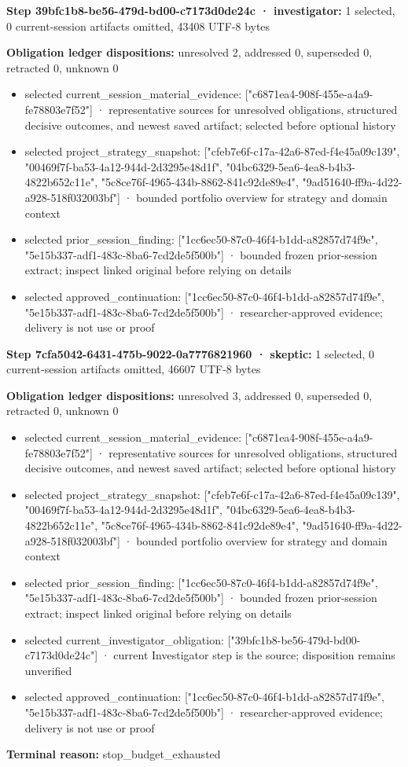 \documentclass[11pt]{article}
\begin{document}
\textbf{Step 39bfc1b8-be56-479d-bd00-c7173d0de24c · investigator:} 1 selected, 0 current-session artifacts omitted, 43408 UTF-8 bytes\par
\textbf{Obligation ledger dispositions:} unresolved 2, addressed 0, superseded 0, retracted 0, unknown 0\par
\begin{itemize}
\item selected current\_session\_material\_evidence: ["c6871ea4-908f-455e-a4a9-fe78803e7f52"] · representative sources for unresolved obligations, structured decisive outcomes, and newest saved artifact; selected before optional history
\item selected project\_strategy\_snapshot: ["cfeb7e6f-c17a-42a6-87ed-f4e45a09c139", "00469f7f-ba53-4a12-944d-2d3295e48d1f", "04bc6329-5ea6-4ea8-b4b3-4822b652c11e", "5c8ce76f-4965-434b-8862-841c92de89e4", "9ad51640-ff9a-4d22-a928-518f032003bf"] · bounded portfolio overview for strategy and domain context
\item selected prior\_session\_finding: ["1cc6ec50-87c0-46f4-b1dd-a82857d74f9e", "5e15b337-adf1-483c-8ba6-7cd2de5f500b"] · bounded frozen prior-session extract; inspect linked original before relying on details
\item selected approved\_continuation: ["1cc6ec50-87c0-46f4-b1dd-a82857d74f9e", "5e15b337-adf1-483c-8ba6-7cd2de5f500b"] · researcher-approved evidence; delivery is not use or proof
\end{itemize}
\textbf{Step 7cfa5042-6431-475b-9022-0a7776821960 · skeptic:} 1 selected, 0 current-session artifacts omitted, 46607 UTF-8 bytes\par
\textbf{Obligation ledger dispositions:} unresolved 3, addressed 0, superseded 0, retracted 0, unknown 0\par
\begin{itemize}
\item selected current\_session\_material\_evidence: ["c6871ea4-908f-455e-a4a9-fe78803e7f52"] · representative sources for unresolved obligations, structured decisive outcomes, and newest saved artifact; selected before optional history
\item selected project\_strategy\_snapshot: ["cfeb7e6f-c17a-42a6-87ed-f4e45a09c139", "00469f7f-ba53-4a12-944d-2d3295e48d1f", "04bc6329-5ea6-4ea8-b4b3-4822b652c11e", "5c8ce76f-4965-434b-8862-841c92de89e4", "9ad51640-ff9a-4d22-a928-518f032003bf"] · bounded portfolio overview for strategy and domain context
\item selected prior\_session\_finding: ["1cc6ec50-87c0-46f4-b1dd-a82857d74f9e", "5e15b337-adf1-483c-8ba6-7cd2de5f500b"] · bounded frozen prior-session extract; inspect linked original before relying on details
\item selected current\_investigator\_obligation: ["39bfc1b8-be56-479d-bd00-c7173d0de24c"] · current Investigator step is the source; disposition remains unverified
\item selected approved\_continuation: ["1cc6ec50-87c0-46f4-b1dd-a82857d74f9e", "5e15b337-adf1-483c-8ba6-7cd2de5f500b"] · researcher-approved evidence; delivery is not use or proof
\end{itemize}
\textbf{Terminal reason:} stop\_budget\_exhausted\par
\end{document}
